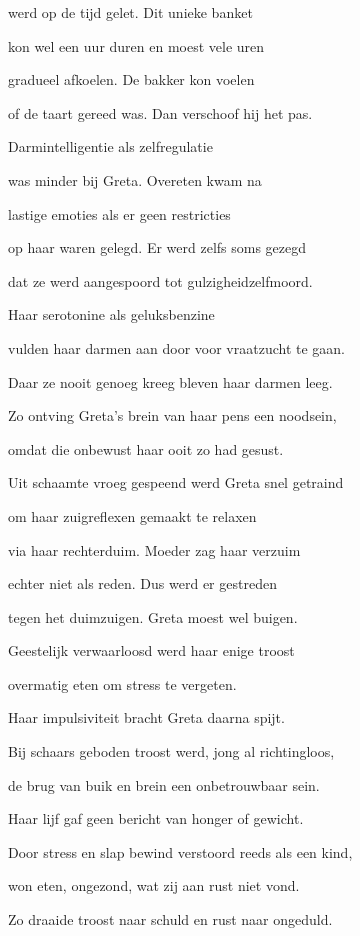 werd op de tijd gelet.
Dit unieke banket

kon wel een uur duren
en moest vele uren

gradueel afkoelen.
De bakker kon voelen

of de taart gereed was.
Dan verschoof hij het pas.

Darmintelligentie
als zelfregulatie

was minder bij Greta.
Overeten kwam na

lastige emoties
als er geen restricties

op haar waren gelegd.
Er werd zelfs soms gezegd

dat ze werd aangespoord
tot gulzigheidzelfmoord.

Haar serotonine
als geluksbenzine

vulden haar darmen aan
door voor vraatzucht te gaan.

Daar ze nooit genoeg kreeg
bleven haar darmen leeg.

Zo ontving Greta’s brein
van haar pens een noodsein,

omdat die onbewust
haar ooit zo had gesust.

Uit schaamte vroeg gespeend
werd Greta snel getraind

om haar zuigreflexen
gemaakt te relaxen

via haar rechterduim.
Moeder zag haar verzuim

echter niet als reden.
Dus werd er gestreden

tegen het duimzuigen.
Greta moest wel buigen.

Geestelijk verwaarloosd
werd haar enige troost

overmatig eten
om stress te vergeten.

Haar impulsiviteit
bracht Greta daarna spijt.

Bij schaars geboden troost
werd, jong al richtingloos,

de brug van buik en brein
een onbetrouwbaar sein.

Haar lijf gaf geen bericht
van honger of gewicht.

Door stress en slap bewind
verstoord reeds als een kind,

won eten, ongezond,
wat zij aan rust niet vond.

Zo draaide troost naar schuld
en rust naar ongeduld.